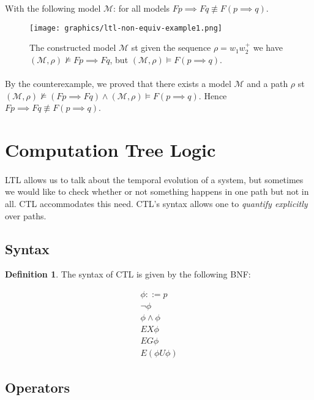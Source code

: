 \documentclass{article}
\theoremstyle{plain}
\theoremstyle{definition}
\newtheorem{defn}[thm]{Definition} %
\begin{document}
\begin{multicols}{2}
\noindent With the following model $\mathcal{M}$: for all models $Fp \implies Fq \not\equiv F(p \implies q)$.

\begin{figure}[H]
\centering
\texttt{[image: graphics/ltl-non-equiv-example1.png]}
\caption{The constructed model $\mathcal{M}$ st given the sequence $\rho = w_1 w_2^+$ we have $(\mathcal{M}, \rho) \not\models Fp \implies Fq$, but $(\mathcal{M}, \rho) \models F(p \implies q)$.}
\end{figure}

\paragraph{} By the counterexample, we proved that there exists a model $\mathcal{M}$ and a path $\rho$ st $(\mathcal{M}, \rho) \not\models (Fp \implies Fq) \land (\mathcal{M}, \rho) \models F(p \implies q)$. Hence $Fp \implies Fq \not\equiv F(p \implies q)$.

\section{Computation Tree Logic}

\paragraph{} LTL allows us to talk about the temporal evolution of a system, but sometimes we would like to check whether or not something happens in one path but not in all. CTL accommodates this need. CTL's syntax allows one to \textit{quantify explicitly} over paths.

\subsection{Syntax}
\begin{defn}The syntax of CTL is given by the following BNF:\end{defn}

\begin{align*}
\phi ::= p \\
\lnot\phi \\
\phi \land \phi  \\
EX\phi \\
EG\phi \\
E(\phi U \phi)
\end{align*}

\subsection{Operators}\label{subsec:Operators}


\end{multicols}
\end{document}
